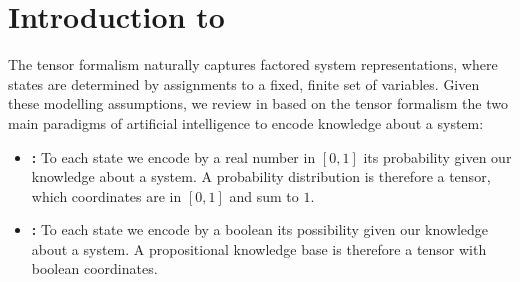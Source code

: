 \chapter{Introduction to }

The tensor formalism naturally captures factored system representations, where states are determined by assignments to a fixed, finite set of variables.
Given these modelling assumptions, we review in  based on the tensor formalism the two main paradigms of artificial intelligence to encode knowledge about a system:
\begin{itemize}
    \item \textbf{\ProbabilityTheory{}:} To each state we encode by a real number in $[0,1]$ its probability given our knowledge about a system.
    A probability distribution is therefore a tensor, which coordinates are in $[0,1]$ and sum to $1$.
    \item \textbf{\PropositionalLogic{}:} To each state we encode by a boolean its possibility given our knowledge about a system.
    A propositional knowledge base is therefore a tensor with boolean coordinates.
\end{itemize}



